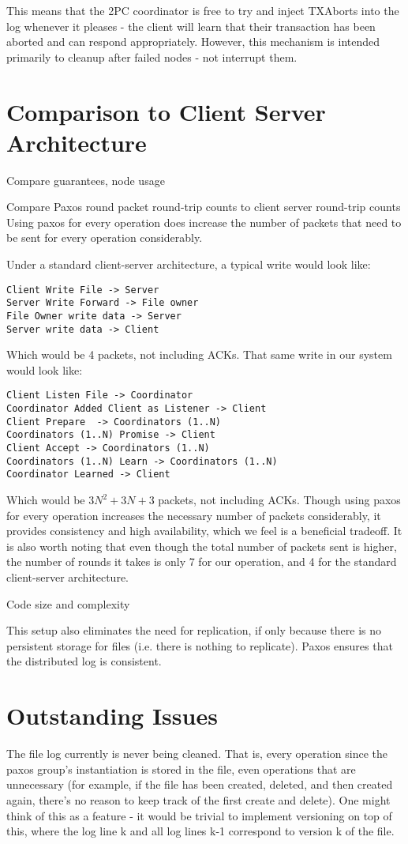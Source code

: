 \documentclass[11pt]{article}
\begin{document}
This means that the 2PC coordinator is free to try and inject TXAborts into the log whenever it pleases - the client will learn that their transaction has been aborted and can respond appropriately. However, this mechanism is intended primarily to cleanup after failed nodes - not interrupt them.

\section{Comparison to Client Server Architecture}

Compare guarantees, node usage

Compare Paxos round packet round-trip counts to client server round-trip counts
Using paxos for every operation does increase the number of packets that need to be sent for every operation considerably.

Under a standard client-server architecture, a typical write would look like:
\begin{verbatim}
Client Write File -> Server
Server Write Forward -> File owner
File Owner write data -> Server
Server write data -> Client
\end{verbatim}

Which would be 4 packets, not including ACKs. That same write in our system would look like:
\begin{verbatim}
Client Listen File -> Coordinator
Coordinator Added Client as Listener -> Client
Client Prepare  -> Coordinators (1..N)
Coordinators (1..N) Promise -> Client
Client Accept -> Coordinators (1..N)
Coordinators (1..N) Learn -> Coordinators (1..N)
Coordinator Learned -> Client
\end{verbatim}

Which would be $3N^2 + 3N + 3$ packets, not including ACKs. Though using paxos for every operation increases the necessary number of packets considerably, it provides consistency and high availability, which we feel is a beneficial tradeoff. It is also worth noting that even though the total number of packets sent is higher, the number of rounds it takes is only 7 for our operation, and 4 for the standard client-server architecture. 


Code size and complexity

This setup also eliminates the need for replication, if only because there is no persistent storage for files (i.e. there is nothing to replicate). Paxos ensures that the distributed log is consistent.

\section{Outstanding Issues}
The file log currently is never being cleaned. That is, every operation since the paxos group's instantiation is stored in the file, even operations that are unnecessary (for example, if the file has been created, deleted, and then created again, there's no reason to keep track of the first create and delete). One might think of this as a feature - it would be trivial to implement versioning on top of this, where the log line k and all log lines k-1 correspond to version k of the file. 
\end{document}

